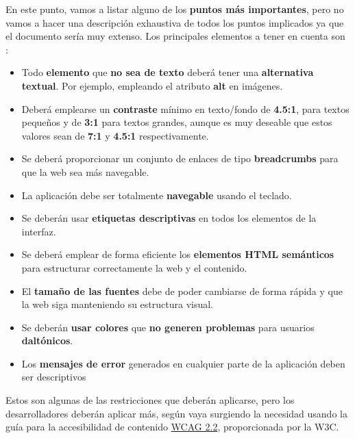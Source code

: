 En este punto, vamos a listar alguno de los \textbf{puntos más importantes}, pero no vamos a hacer una descripción exhaustiva de todos los puntos implicados ya que el documento sería muy extenso. Los principales elementos a tener en cuenta son \cite{wai-wcag}: 

\begin{itemize}
	\item Todo \textbf{elemento} que \textbf{no sea de texto} deberá tener una \textbf{alternativa textual}. Por ejemplo, empleando el atributo \textbf{alt} en imágenes.
	
	\item Deberá emplearse un \textbf{contraste} mínimo en texto/fondo de \textbf{4.5:1}, para textos pequeños y de \textbf{3:1} para textos grandes, aunque es muy deseable que estos valores sean de \textbf{7:1} y \textbf{4.5:1} respectivamente.
	
	\item Se deberá proporcionar un conjunto de enlaces de tipo \textbf{breadcrumbs} para que la web sea más navegable.
	
	\item La aplicación debe ser totalmente \textbf{navegable} usando el teclado.
	
	\item Se deberán usar \textbf{etiquetas descriptivas} en todos los elementos de la interfaz.
	
	\item Se deberá emplear de forma eficiente los \textbf{elementos HTML semánticos} para estructurar correctamente la web y el contenido.
	
	\item El \textbf{tamaño de las fuentes} debe de poder cambiarse de forma rápida y que la web siga manteniendo su estructura visual.
	
	\item Se deberán \textbf{usar colores} que \textbf{no generen problemas} para usuarios \textbf{daltónicos}.
	
	\item Los \textbf{mensajes de error} generados en cualquier parte de la aplicación deben ser descriptivos
\end{itemize}

Estos son algunas de las restricciones que deberán aplicarse, pero los desarrolladores deberán aplicar más, según vaya surgiendo la necesidad usando la guía para la accesibilidad de contenido \href{https://www.w3.org/TR/WCAG22/}{WCAG 2.2}, proporcionada por la W3C.

